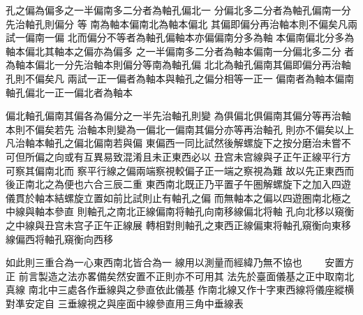 \begin{正文}
孔之偏為偏多之一半偏南多二分者為軸孔偏北一
分偏北多二分者為軸孔偏南一分先治軸孔則偏分
等
南為軸本偏南北為軸本偏北
其偏即偏分再治軸本則不偏矣凡兩試一偏南一偏
北而偏分不等者為軸孔偏軸本亦偏偏南分多為軸
本偏南偏北分多為軸本偏北其軸本之偏亦為偏多
之一半偏南多二分者為軸本偏南一分偏北多二分
者為軸本偏北一分先治軸本則偏分等南為軸孔偏
北北為軸孔偏南其偏即偏分再治軸孔則不偏矣凡
兩試一正一偏者為軸本與軸孔之偏分相等一正一
偏南者為軸本偏南軸孔偏北一正一偏北者為軸本
\par
偏北軸孔偏南其偏各為偏分之一半先治軸孔則變
為俱偏北俱偏南其偏分等再治軸本則不偏矣若先
治軸本則變為一偏北一偏南其偏分亦等再治軸孔
則亦不偏矣以上凡治軸本軸孔之偏北偏南若與偏
東偏西一同比試然後解螺旋下之按分磨治未嘗不
可但所偏之向或有互異易致混淆且未正東西必以
丑宫未宫線與子正午正線平行方可察其偏南北而
察平行線之偏兩端察視較偏子正一端之察視為難
故以先正東西而後正南北之為便也六合三辰二重
東西南北既正乃平置子午圏解螺旋下之加入四遊
儀貫於軸本結螺旋立置如前比試則止有軸孔之偏
而無軸本之偏以四遊圏南北極之中線與軸本參直
則軸孔之南北正線偏南将軸孔向南移線偏北将軸
孔向北移以窺衡之中線與丑宫未宫子正午正線展
轉相對則軸孔之東西正線偏東将軸孔窺衡向東移
線偏西将軸孔窺衡向西移
\par
如此則三重合為一心東西南北皆合為一
線用以測量而經緯乃無不協也
　　安置方正
前言製造之法亦畧備矣然安置不正則亦不可用其
法先於臺面儀基之正中取南北真線
南北中三處各作垂線與之參直依此儀基
作南北線又作十字東西線将儀座縱横對凖安定自
三垂線視之與座面中線參直用三角中垂線表

\end{正文}
